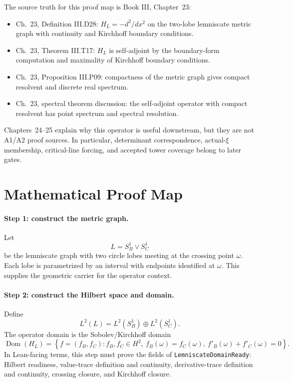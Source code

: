 \documentclass[11pt]{article}
\newcommand{\Dom}{\operatorname{Dom}}
\begin{document}
The source truth for this proof map is Book III, Chapter~23:
\begin{itemize}
\item Ch.~23, Definition III.D28: \(H_L=-d^2/dx^2\) on the two-lobe
  lemniscate metric graph with continuity and Kirchhoff boundary conditions.
\item Ch.~23, Theorem III.T17: \(H_L\) is self-adjoint by the boundary-form
  computation and maximality of Kirchhoff boundary conditions.
\item Ch.~23, Proposition III.P09: compactness of the metric graph gives
  compact resolvent and discrete real spectrum.
\item Ch.~23, spectral theorem discussion: the self-adjoint operator with
  compact resolvent has point spectrum and spectral resolution.
\end{itemize}
Chapters~24--25 explain why this operator is useful downstream, but they are
not A1/A2 proof sources.  In particular, determinant correspondence,
actual-\(\xi\) membership, critical-line forcing, and accepted tower coverage
belong to later gates.

\section*{Mathematical Proof Map}

\paragraph{Step 1: construct the metric graph.}
Let
\[
  L=S^1_B\vee S^1_C
\]
be the lemniscate graph with two circle lobes meeting at the crossing point
\(\omega\).  Each lobe is parametrized by an interval with endpoints
identified at \(\omega\).  This supplies the geometric carrier for the
operator context.

\paragraph{Step 2: construct the Hilbert space and domain.}
Define
\[
  L^2(L)=L^2(S^1_B)\oplus L^2(S^1_C).
\]
The operator domain is the Sobolev/Kirchhoff domain
\[
  \Dom(H_L)=
  \left\{
    f=(f_B,f_C):
    f_B,f_C\in H^2,\
    f_B(\omega)=f_C(\omega),\
    f'_B(\omega)+f'_C(\omega)=0
  \right\}.
\]
In Lean-facing terms, this step must prove the fields of
\texttt{LemniscateDomainReady}: Hilbert readiness, value-trace definition and
continuity, derivative-trace definition and continuity, crossing closure, and
Kirchhoff closure.
\end{document}
